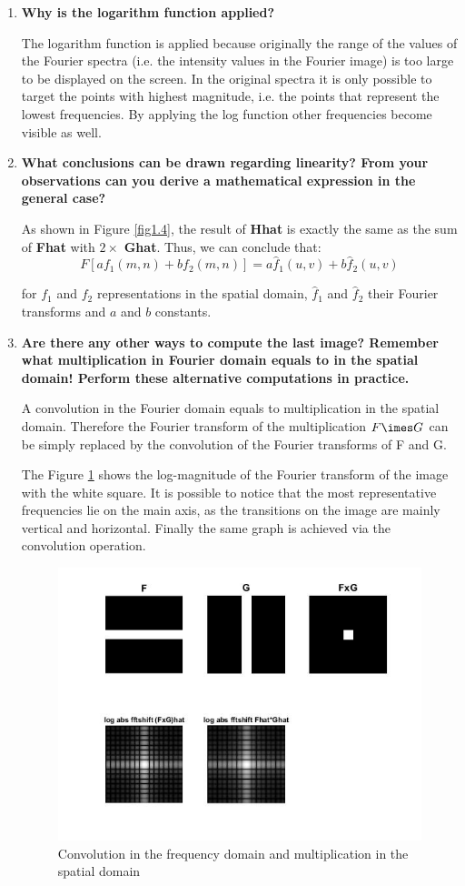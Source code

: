 \documentclass{article}
\begin{document}
\begin{enumerate}
\item \textbf{Why is the logarithm function applied?}

The logarithm function is applied because originally the range of the values of the Fourier spectra (i.e. the intensity values in the Fourier image) is too large to be displayed on the screen. In the original spectra it is only possible to target the points with highest magnitude, i.e. the points that represent the lowest frequencies. By applying the log function other frequencies become visible as well.

\item \textbf{What conclusions can be drawn regarding linearity? From your observations
can you derive a mathematical expression in the general case?}
\par
As shown in Figure \ref{fig1.4}, the result of \textbf{Hhat} is exactly the same as the sum of \textbf{Fhat} with $2 \times $ \textbf{Ghat}. Thus, we can conclude that:
$$F[a f_1(m,n) + b f_2(m,n)] = a \hat f_1(u,v) + b \hat f_2(u,v)$$

for $f_1$ and $f_2$ representations in the spatial domain, $\hat f_1$ and $\hat f_2$ their Fourier transforms and $a$ and $b$ constants.

\item \textbf{Are there any other ways to compute the last image? Remember what multiplication in Fourier domain equals to in the spatial domain! Perform these alternative computations in practice.}
\par
A convolution in the Fourier domain equals to multiplication in the spatial domain. Therefore the Fourier transform of the multiplication $F \imes G$ can be simply replaced by the convolution of the Fourier transforms of F and G.

The Figure \ref{fig1.5} shows the log-magnitude of the Fourier transform of the image with the white square. It is possible to notice that the most representative frequencies lie on the main axis, as the transitions on the image are mainly vertical and horizontal. Finally the same graph is achieved via the convolution operation.

\begin{figure}[H]
        \centering
        \includegraphics[width=11cm]{15.jpg}
        \caption{Convolution in the frequency domain and multiplication in the spatial domain}
        \label{fig1.5}
\end{figure}


\end{enumerate}
\end{document}
